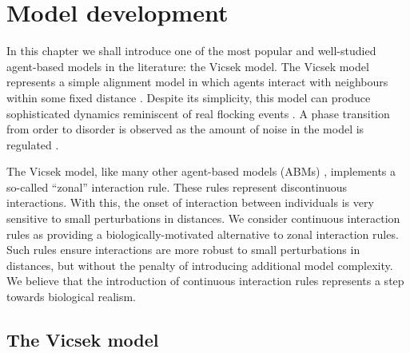 \graphicspath{{fig/model_development/}}

\chapter{Model development}
\label{cha:model_dev}

In this chapter we shall introduce one of the most popular and well-studied
agent-based models in the literature: the Vicsek model. The Vicsek model
represents a simple alignment model in which agents interact with neighbours
within some fixed distance \parencite{vicsek95}. Despite its simplicity, this
model can produce sophisticated dynamics reminiscent of real flocking events
\parencite{ginelli16}. A phase transition from order to disorder is observed as
the amount of noise in the model is regulated \parencite{vicsek12}.

The Vicsek model, like many other agent-based models (ABMs)
\parencite{aoki82,huth92,couzin02}, implements a so-called ``zonal''
interaction rule. These rules represent discontinuous interactions. With this,
the onset of interaction between individuals is very sensitive to small
perturbations in distances. We consider continuous interaction rules as
providing a biologically-motivated alternative to zonal interaction rules. Such
rules ensure interactions are more robust to small perturbations in distances,
but without the penalty of introducing additional model complexity. We believe
that the introduction of continuous interaction rules represents a step towards
biological realism. 

\section{The Vicsek model}
\label{sec:vicsek_model}


